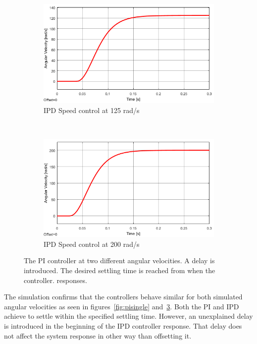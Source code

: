 \begin{figure}[h!]
	\centering
	\begin{subfigure}[b]{0.45\textwidth}
		\includegraphics[width=\textwidth]{graphics/IPD_single125}
		\caption{IPD Speed control at 125 rad/s}
		\label{fig:ipdsingle125}
	\end{subfigure}
	~ %
	\begin{subfigure}[b]{0.45\textwidth}
		\includegraphics[width=\textwidth]{graphics/IPD_single200}
		\caption{IPD Speed control at 200 rad/s}
		\label{fig:ipdsingle200}
	\end{subfigure}
	\caption{The PI controller at two different angular velocities. A delay is introduced. The desired settling time is reached from when the controller. responses.}\label{fig:ipdsingle}
\end{figure}

The simulation confirms that the controllers behave similar for both simulated angular velocities as seen in figures~\ref{fig:pisingle} and~\ref{fig:ipdsingle}. Both the PI and IPD achieve to settle within the specified settling time. However, an unexplained delay is introduced in the beginning of the IPD controller response. That delay does not affect the system response in other way than offsetting it.

